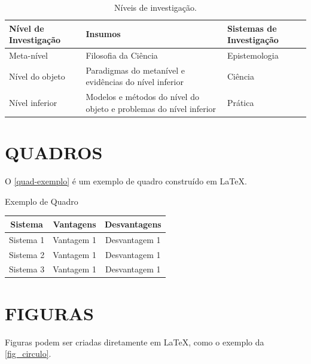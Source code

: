 \begin{table}[htb]
\footnotesize
\caption[Níveis de investigação]{Níveis de investigação.}
\label{tab-nivinv}
\centering
\begin{tabular}{p{1.6cm}|p{4.0cm}|p{2.25cm}}
   \textbf{Nível de Investigação} & \textbf{Insumos}  & \textbf{Sistemas de Investigação}   \\
    \hline
    Meta-nível & Filosofia\index{filosofia} da Ciência  & Epistemologia  \\
    \hline
    Nível do objeto & Paradigmas do metanível e evidências do nível inferior &
    Ciência \\
    \hline
    Nível inferior & Modelos e métodos do nível do objeto e problemas do nível inferior & Prática \\
\end{tabular}
\end{table}

\section{\uppercase{Quadros}}

O \autoref{quad-exemplo} é um exemplo de quadro construído em
\LaTeX.

\begin{quadro}[!ht]
	\footnotesize
	\caption{Exemplo de Quadro}
	\label{quad-exemplo}
	\centering
	\begin{tabular}{|c|c|c|}
		\hline
		\textbf{Sistema} & \textbf{Vantagens}  & \textbf{Desvantagens}   \\
		\hline
		Sistema 1 & Vantagem 1 & Desvantagem 1  \\ \hline
		Sistema 2 & Vantagem 1 & Desvantagem 1  \\ \hline
		Sistema 3 & Vantagem 1 & Desvantagem 1  \\ \hline
	\end{tabular}
\end{quadro}

\section{\uppercase{Figuras}}

Figuras podem ser criadas diretamente em \LaTeX,
como o exemplo da \autoref{fig_circulo}.

